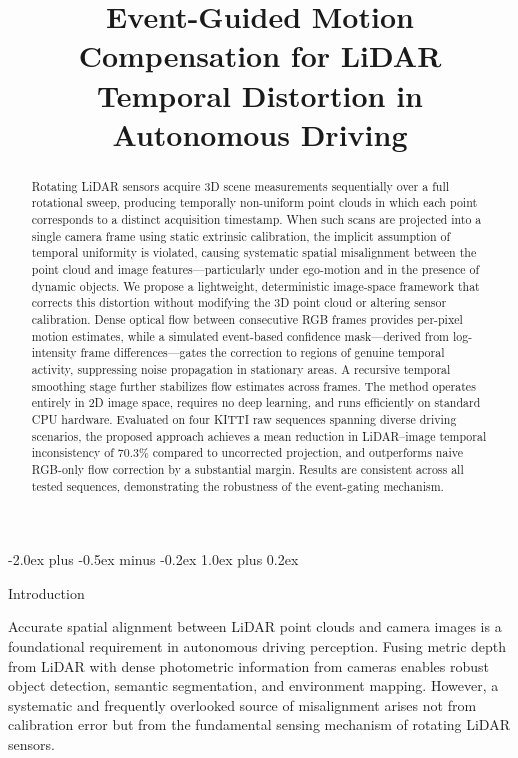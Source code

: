 \documentclass[conference]{IEEEtran}
\title{Event-Guided Motion Compensation for LiDAR\\
Temporal Distortion in Autonomous Driving}
\author{
\IEEEauthorblockN{Sahal Ansar}
\IEEEauthorblockA{Department of Engineering\\
Email: your-email@example.com}
}
\makeatletter
\def\section{\@startsection{section}{1}{\z@}
  {-2.0ex plus -0.5ex minus -0.2ex}
  {1.0ex plus 0.2ex}
  {\normalfont\large\bfseries\raggedright}}
\makeatother
\begin{document}
\maketitle

\begin{abstract}
Rotating LiDAR sensors acquire 3D scene measurements sequentially
over a full rotational sweep, producing temporally non-uniform point
clouds in which each point corresponds to a distinct acquisition
timestamp. When such scans are projected into a single camera frame
using static extrinsic calibration, the implicit assumption of
temporal uniformity is violated, causing systematic spatial
misalignment between the point cloud and image features---particularly
under ego-motion and in the presence of dynamic objects. We propose a
lightweight, deterministic image-space framework that corrects this
distortion without modifying the 3D point cloud or altering sensor
calibration. Dense optical flow between consecutive RGB frames
provides per-pixel motion estimates, while a simulated event-based
confidence mask---derived from log-intensity frame differences---gates
the correction to regions of genuine temporal activity, suppressing
noise propagation in stationary areas. A recursive temporal smoothing
stage further stabilizes flow estimates across frames. The method
operates entirely in 2D image space, requires no deep learning, and
runs efficiently on standard CPU hardware. Evaluated on four KITTI
raw sequences spanning diverse driving scenarios, the proposed
approach achieves a mean reduction in LiDAR--image temporal
inconsistency of 70.3\% compared to uncorrected projection, and
outperforms naive RGB-only flow correction by a substantial margin.
Results are consistent across all tested sequences, demonstrating
the robustness of the event-gating mechanism.
\end{abstract}

\section{Introduction}

Accurate spatial alignment between LiDAR point clouds and camera
images is a foundational requirement in autonomous driving
perception. Fusing metric depth from LiDAR with dense photometric
information from cameras enables robust object detection, semantic
segmentation, and environment mapping. However, a systematic and
frequently overlooked source of misalignment arises not from
calibration error but from the fundamental sensing mechanism of
rotating LiDAR sensors.
\end{document}
